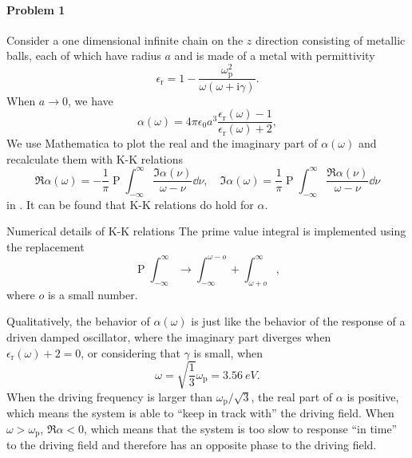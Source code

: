\documentclass[hyperref, a4paper]{article}
\DeclareMathOperator{\primevalue}{P}
\newcommand*{\ii}{\mathrm{i}}
\begin{document}
\paragraph{Problem 1} Consider a one dimensional infinite chain on the $z$ direction consisting of metallic balls, 
each of which have radius $a$ and is made of a metal with permittivity
\begin{equation}
    \epsilon_\text{r} = 1 - \frac{\omega_\text{p}^2}{\omega (\omega + \ii \gamma)}.
\end{equation} 
When $a \to 0$, we have
\begin{equation}
    \alpha(\omega) = 4 \pi \epsilon_0 a^3 \frac{\epsilon_\text{r}(\omega) - 1}{\epsilon_\text{r}(\omega) + 2},
\end{equation}
We use Mathematica to plot the real and the imaginary part of $\alpha(\omega)$ and recalculate them with 
K-K relations 
\begin{equation}
    \Re \alpha(\omega) = - \frac{1}{\pi} \primevalue \int_{-\infty}^\infty \frac{\Im \alpha(\nu)}{\omega - \nu} \dd{\nu}, \quad \Im \alpha(\omega) = \frac{1}{\pi} \primevalue \int_{-\infty}^\infty \frac{\Re \alpha(\nu)}{\omega - \nu} \dd{\nu}
    \label{eq:kk-relation}
\end{equation}
in . It can be found that K-K relations do hold for $\alpha$. 

\begin{note*}{Numerical details of K-K relations}
    The prime value integral is implemented using the replacement 
    \[
        \primevalue \int_{-\infty}^\infty \longrightarrow \int_{-\infty}^{\omega - o} + \int_{\omega+o}^\infty,
    \]
    where $o$ is a small number.
\end{note*}

Qualitatively, the behavior 
of $\alpha(\omega)$ is just like the behavior of the response of a driven damped oscillator, where the imaginary 
part diverges when $\epsilon_\text{r}(\omega) + 2 = 0$, or considering that $\gamma$ is small, when 
\begin{equation}
    \omega = \sqrt{\frac{1}{3}} \omega_\text{p} = \SI{3.56}{eV}.
\end{equation}
When the driving frequency is larger than $\omega_\text{p} / \sqrt{3}$, the real part of $\alpha$ is positive, 
which means the system is able to ``keep in track with'' the driving field. When $\omega > \omega_\text{p}$,
$\Re \alpha < 0$, which means that the system is too slow to response ``in time'' to the driving field and 
therefore has an opposite phase to the driving field.
\end{document}
